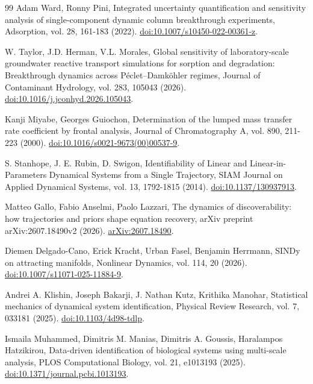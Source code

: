 \begin{thebibliography}{99}
 Adam Ward, Ronny Pini, Integrated uncertainty quantification and sensitivity analysis of single-component dynamic column breakthrough experiments, Adsorption, vol. 28, 161-183 (2022). \href{https://doi.org/10.1007/s10450-022-00361-z}{doi:10.1007/s10450-022-00361-z}.

 W. Taylor, J.D. Herman, V.L. Morales, Global sensitivity of laboratory-scale groundwater reactive transport simulations for sorption and degradation: Breakthrough dynamics across Péclet--Damköhler regimes, Journal of Contaminant Hydrology, vol. 283, 105043 (2026). \href{https://doi.org/10.1016/j.jconhyd.2026.105043}{doi:10.1016/j.jconhyd.2026.105043}.

 Kanji Miyabe, Georges Guiochon, Determination of the lumped mass transfer rate coefficient by frontal analysis, Journal of Chromatography A, vol. 890, 211-223 (2000). \href{https://doi.org/10.1016/s0021-9673(00)00537-9}{doi:10.1016/s0021-9673(00)00537-9}.

 S. Stanhope, J. E. Rubin, D. Swigon, Identifiability of Linear and Linear-in-Parameters Dynamical Systems from a Single Trajectory, SIAM Journal on Applied Dynamical Systems, vol. 13, 1792-1815 (2014). \href{https://doi.org/10.1137/130937913}{doi:10.1137/130937913}.

 Matteo Gallo, Fabio Anselmi, Paolo Lazzari, The dynamics of discoverability: how trajectories and priors shape equation recovery, arXiv preprint arXiv:2607.18490v2 (2026). \href{https://arxiv.org/abs/2607.18490}{arXiv:2607.18490}.

 Diemen Delgado-Cano, Erick Kracht, Urban Fasel, Benjamin Herrmann, SINDy on attracting manifolds, Nonlinear Dynamics, vol. 114, 20 (2026). \href{https://doi.org/10.1007/s11071-025-11884-9}{doi:10.1007/s11071-025-11884-9}.

 Andrei A. Klishin, Joseph Bakarji, J. Nathan Kutz, Krithika Manohar, Statistical mechanics of dynamical system identification, Physical Review Research, vol. 7, 033181 (2025). \href{https://doi.org/10.1103/4d98-tdlp}{doi:10.1103/4d98-tdlp}.

 Ismaila Muhammed, Dimitris M. Manias, Dimitris A. Goussis, Haralampos Hatzikirou, Data-driven identification of biological systems using multi-scale analysis, PLOS Computational Biology, vol. 21, e1013193 (2025). \href{https://doi.org/10.1371/journal.pcbi.1013193}{doi:10.1371/journal.pcbi.1013193}.


\end{thebibliography}
